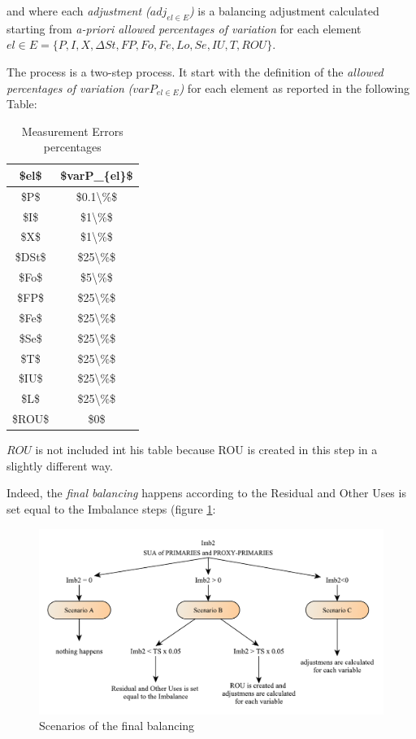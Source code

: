 \documentclass[]{article}
\begin{document}
and where each \emph{adjustment (\(adj_{el \in E}\))} is a balancing
adjustment calculated starting from \emph{a-priori allowed percentages
of variation} for each element
\(el \in E = \{P,I,X,\Delta St, FP,Fo,Fe,Lo,Se,IU,T,ROU\}\).

The process is a two-step process. It start with the definition of the
\emph{allowed percentages of variation} \emph{(\(varP_{el \in E}\))} for
each element as reported in the following Table:

\begin{table}

\caption{\label{tab:t21}Measurement Errors percentages}
\centering
\begin{tabular}[t]{c|c}
\hline
\$el\$ & \$varP\_\{el\}\$\\
\hline
\$P\$ & \$0.1\textbackslash{}\%\$\\
\hline
\$I\$ & \$1\textbackslash{}\%\$\\
\hline
\$X\$ & \$1\textbackslash{}\%\$\\
\hline
\$DSt\$ & \$25\textbackslash{}\%\$\\
\hline
\$Fo\$ & \$5\textbackslash{}\%\$\\
\hline
\$FP\$ & \$25\textbackslash{}\%\$\\
\hline
\$Fe\$ & \$25\textbackslash{}\%\$\\
\hline
\$Se\$ & \$25\textbackslash{}\%\$\\
\hline
\$T\$ & \$25\textbackslash{}\%\$\\
\hline
\$IU\$ & \$25\textbackslash{}\%\$\\
\hline
\$L\$ & \$25\textbackslash{}\%\$\\
\hline
\$ROU\$ & \$0\$\\
\hline
\end{tabular}
\end{table}

\(ROU\) is not included int his table because ROU is created in this
step in a slightly different way.

Indeed, the \emph{final balancing} happens according to the Residual and
Other Uses is set equal to the Imbalance steps (figure \ref{fig:f10}:

\begin{figure}[H]

{\centering \includegraphics[width=1\linewidth]{images/StandBal/11_ScenariosFinalBal} 

}

\caption{\label{fig:f10}Scenarios of the final balancing}\label{fig:f10}
\end{figure}
\end{document}
